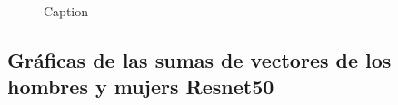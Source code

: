 \documentclass[runningheads]{llncs}
\begin{document}
\begin{figure}
\caption{Caption}
\label{img-vgg16-freqs}
\end{figure}

\subsection{Gráficas de las sumas de vectores de los hombres y mujers Resnet50}
\end{document}
